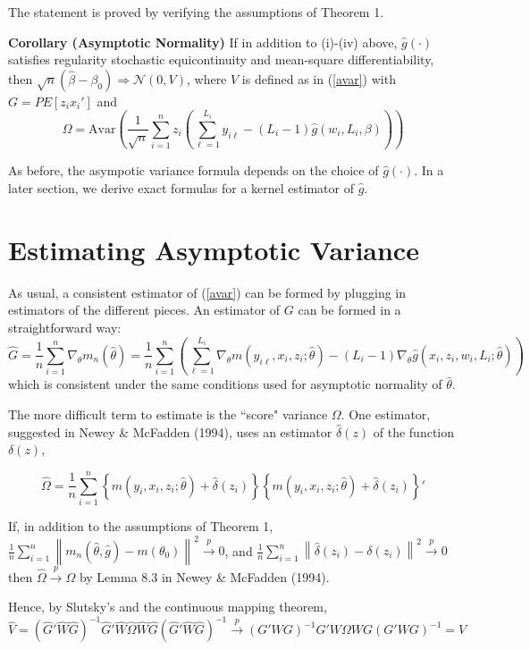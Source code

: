 \documentclass[12pt]{article}
\newcommand{\toP}{\overset{p}{\to}}
\newcommand{\meanN}{\frac{1}{n}\sum_{i=1}^n}
\begin{document}
The statement is proved by verifying the assumptions of Theorem 1. 

\textbf{Corollary (Asymptotic Normality)} If in addition to (i)-(iv) above, $\hat{g}(\cdot)$ satisfies regularity stochastic equicontinuity and mean-square differentiability, then $\sqrt{n}(\hat{\beta}-\beta_0) \Rightarrow \mathcal{N}(0, V)$, where $V$ is defined as in (\ref{avar}) with $G= PE[z_ix_i']$ and 
$$\Omega = \text{Avar}\left( \frac{1}{\sqrt{n}}\sum_{i=1}^n z_i \left(\sum_{\ell=1}^{L_i} y_{i\ell} - (L_i-1)\hat{g}(w_i,L_i,\beta)\right)\right) $$ 

As before, the asympotic variance formula depends on the choice of $\hat{g}(\cdot)$.  In a later section, we derive exact formulas for a kernel estimator of $\hat{g}$.  

\section{Estimating Asymptotic Variance}

As usual, a consistent estimator of (\ref{avar}) can be formed by plugging in estimators of the different pieces.  An estimator of $G$ can be formed in a straightforward way:
$$ \hat{G} = \meanN \nabla_{\theta} m_n(\hat{\theta}) = \meanN \left(\sum_{\ell=1}^{L_i}\nabla_{\theta} m(y_{i\ell}, x_i, z_i; \hat{\theta}) - (L_i-1) \nabla_{\theta}\hat{g}(x_i, z_i, w_i, L_i; \hat{\theta})\right)$$ 
which is consistent under the same conditions used for asymptotic normality of $\hat{\theta}$. 

The more difficult term to estimate is the ``score" variance $\Omega$.  One estimator, suggested in Newey \& McFadden (1994), uses an estimator $\hat{\delta}(z)$ of the function $\delta(z)$,

$$\hat{\Omega} = \meanN \left\{m(y_{i},x_i,z_i; \hat{\theta}) + \hat{\delta}(z_i)\right\}\left\{m(y_{i},x_i,z_i; \hat{\theta}) + \hat{\delta}(z_i)\right\}'$$

If, in addition to the assumptions of Theorem 1,  $\meanN \left\lVert m_n(\hat{\theta}, \hat{g}) - m( \theta_0) \right\rVert^2 \toP 0$, and $\meanN \left\lVert \hat{\delta}(z_i)-\delta(z_i)\right\rVert^2\toP 0$ then $\hat{\Omega} \toP \Omega$ by Lemma 8.3 in Newey \& McFadden (1994).  

Hence, by Slutsky's and the continuous mapping theorem,
$$ \hat{V} = (\hat{G}'\hat{W}\hat{G})^{-1} \hat{G}'\hat{W}\hat{\Omega} \hat{W}\hat{G} (\hat{G}'\hat{W}\hat{G})^{-1} \toP (G'WG)^{-1}G'W\Omega W G (G'WG)^{-1} = V$$  
\end{document}
